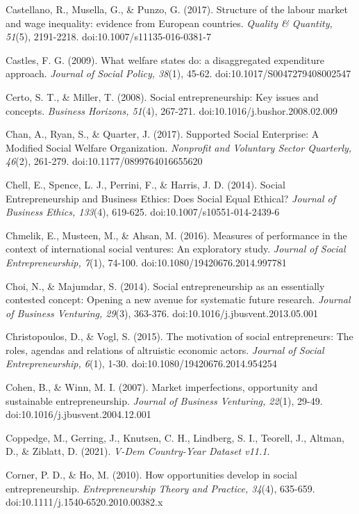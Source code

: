 \documentclass{article}
\begin{document}
Castellano, R., Musella, G., \& Punzo, G. (2017). Structure of the labour market and wage inequality: evidence from European countries. \emph{Quality \& Quantity, 51}(5), 2191-2218. doi:10.1007/s11135-016-0381-7

Castles, F. G. (2009). What welfare states do: a disaggregated expenditure approach. \emph{Journal of Social Policy, 38}(1), 45-62. doi:10.1017/S0047279408002547

Certo, S. T., \& Miller, T. (2008). Social entrepreneurship: Key issues and concepts. \emph{Business Horizons, 51}(4), 267-271. doi:10.1016/j.bushor.2008.02.009

Chan, A., Ryan, S., \& Quarter, J. (2017). Supported Social Enterprise: A Modified Social Welfare Organization. \emph{Nonprofit}\emph{ and Voluntary Sector Quarterly, 46}(2), 261-279. doi:10.1177/0899764016655620

Chell, E., Spence, L. J., Perrini, F., \& Harris, J. D. (2014). Social Entrepreneurship and Business Ethics: Does Social Equal Ethical? \emph{Journal of Business Ethics, 133}(4), 619-625. doi:10.1007/s10551-014-2439-6

Chmelik, E., Musteen, M., \& Ahsan, M. (2016). Measures of performance in the context of international social ventures: An exploratory study. \emph{Journal of Social Entrepreneurship, 7}(1), 74-100. doi:10.1080/19420676.2014.997781

Choi, N., \& Majumdar, S. (2014). Social entrepreneurship as an essentially contested concept: Opening a new avenue for systematic future research. \emph{Journal of Business Venturing, 29}(3), 363-376. doi:10.1016/j.jbusvent.2013.05.001

Christopoulos, D., \& Vogl, S. (2015). The motivation of social entrepreneurs: The roles, agendas and relations of altruistic economic actors. \emph{Journal of Social Entrepreneurship, 6}(1), 1-30. doi:10.1080/19420676.2014.954254

Cohen, B., \& Winn, M. I. (2007). Market imperfections, opportunity and sustainable entrepreneurship. \emph{Journal of Business Venturing, 22}(1), 29-49. doi:10.1016/j.jbusvent.2004.12.001

Coppedge, M., Gerring, J., Knutsen, C. H., Lindberg, S. I., Teorell, J., Altman, D., \& Ziblatt, D. (2021). \emph{V-Dem Country-Year Dataset v11.1}. 

Corner, P. D., \& Ho, M. (2010). How opportunities develop in social entrepreneurship. \emph{Entrepreneurship Theory and Practice, 34}(4), 635-659. doi:10.1111/j.1540-6520.2010.00382.x
\end{document}
